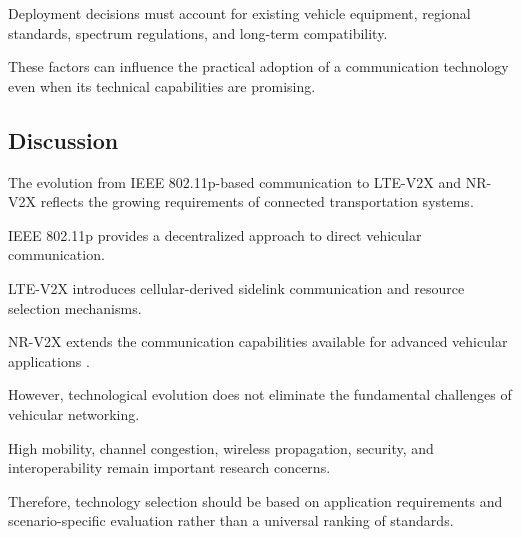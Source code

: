 Deployment decisions
must account for
existing vehicle
equipment, regional
standards, spectrum
regulations, and
long-term compatibility.

These factors can
influence the practical
adoption of a
communication technology
even when its technical
capabilities are
promising.

\subsection{Discussion}

The evolution from
IEEE 802.11p-based
communication to
LTE-V2X and NR-V2X
reflects the growing
requirements of
connected transportation
systems.

IEEE 802.11p provides
a decentralized
approach to direct
vehicular communication.

LTE-V2X introduces
cellular-derived
sidelink communication
and resource selection
mechanisms.

NR-V2X extends the
communication capabilities
available for advanced
vehicular applications
\cite{Molina2017,Naik2019}.

However, technological
evolution does not
eliminate the fundamental
challenges of vehicular
networking.

High mobility,
channel congestion,
wireless propagation,
security, and
interoperability
remain important
research concerns.

Therefore, technology
selection should be
based on application
requirements and
scenario-specific
evaluation rather
than a universal
ranking of standards.
